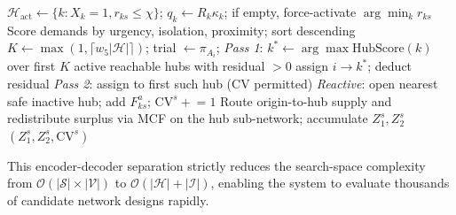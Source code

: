 \documentclass[conference]{IEEEtran}
\begin{document}
\begin{algorithm}[H]
\caption{Priority-Based Recourse Decoder (single scenario $s$)}
\label{alg:decoder}
\small
\begin{algorithmic}[1]
\State $\mathcal{H}_{\text{act}}\!\leftarrow\!\{k:X_k\!=\!1,r_{ks}\!\le\!\chi\}$; $q_k\!\leftarrow\!R_k\kappa_k$; if empty, force-activate $\arg\min_k r_{ks}$
\State Score demands by urgency, isolation, proximity; sort descending
    \State $K\!\leftarrow\!\max(1,\lceil w_5|\mathcal{H}|\rceil)$; trial $\leftarrow\pi_{A_i}$; \textit{Pass 1}: $k^*\!\leftarrow\!\arg\max\text{HubScore}(k)$ over first $K$ active reachable hubs with residual $>0$
     assign $i\!\to\!k^*$; deduct residual
     \textit{Pass 2}: assign to first such hub (CV permitted)
    \Else{} \textit{Reactive}: open nearest safe inactive hub; add $F^a_{ks}$; $\text{CV}^s\!\mathrel{+}=\!1$
    \EndIf
\EndFor
\State Route origin-to-hub supply and redistribute surplus via MCF on the hub sub-network; accumulate $Z_1^s,Z_2^s$
\State \Return $(Z_1^s,Z_2^s,\text{CV}^s)$
\end{algorithmic}
\end{algorithm}
This encoder-decoder separation strictly reduces the search-space complexity from $\mathcal{O}(|\mathcal{S}| \times |\mathcal{V}|)$ to $\mathcal{O}(|\mathcal{H}| + |\mathcal{I}|)$, enabling the system to evaluate thousands of candidate network designs rapidly.
\end{document}

